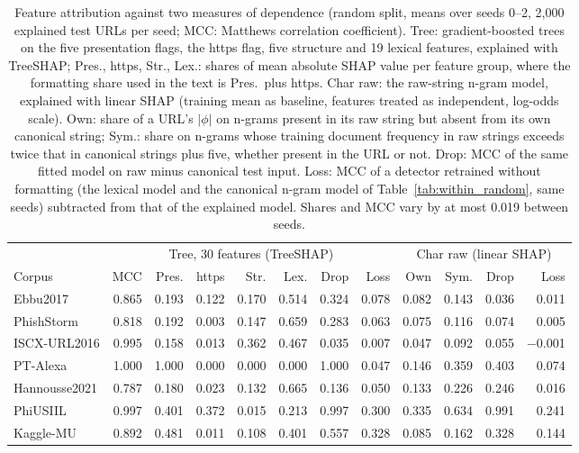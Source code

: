 \begin{table}[tp]
\centering
\caption{Feature attribution against two measures of dependence (random split, means over seeds 0--2, 2,000 explained test URLs per seed; MCC: Matthews correlation coefficient). Tree: gradient-boosted trees on the five presentation flags, the https flag, five structure and 19 lexical features, explained with TreeSHAP; Pres., https, Str., Lex.: shares of mean absolute SHAP value per feature group, where the formatting share used in the text is Pres.\ plus https. Char raw: the raw-string n-gram model, explained with linear SHAP (training mean as baseline, features treated as independent, log-odds scale). Own: share of a URL's $|\phi|$ on n-grams present in its raw string but absent from its own canonical string; Sym.: share on n-grams whose training document frequency in raw strings exceeds twice that in canonical strings plus five, whether present in the URL or not. Drop: MCC of the same fitted model on raw minus canonical test input. Loss: MCC of a detector retrained without formatting (the lexical model and the canonical n-gram model of Table~\ref{tab:within_random}, same seeds) subtracted from that of the explained model. Shares and MCC vary by at most 0.019 between seeds.}
\label{tab:shap}
\footnotesize
\setlength{\tabcolsep}{2.5pt}
\begin{adjustbox}{max width=\linewidth}
\begin{tabular}{@{}lrrrrrrrrrrr@{}}
\toprule
 & \multicolumn{7}{c}{Tree, 30 features (TreeSHAP)} & \multicolumn{4}{c}{Char raw (linear SHAP)} \\
\cmidrule(lr){2-8}\cmidrule(lr){9-12}
Corpus & MCC & Pres. & https & Str. & Lex. & Drop & Loss & Own & Sym. & Drop & Loss \\
\midrule
Ebbu2017 & 0.865 & 0.193 & 0.122 & 0.170 & 0.514 & 0.324 & 0.078 & 0.082 & 0.143 & 0.036 & 0.011 \\
PhishStorm & 0.818 & 0.192 & 0.003 & 0.147 & 0.659 & 0.283 & 0.063 & 0.075 & 0.116 & 0.074 & 0.005 \\
ISCX-URL2016 & 0.995 & 0.158 & 0.013 & 0.362 & 0.467 & 0.035 & 0.007 & 0.047 & 0.092 & 0.055 & $-$0.001 \\
PT-Alexa & 1.000 & 1.000 & 0.000 & 0.000 & 0.000 & 1.000 & 0.047 & 0.146 & 0.359 & 0.403 & 0.074 \\
Hannousse2021 & 0.787 & 0.180 & 0.023 & 0.132 & 0.665 & 0.136 & 0.050 & 0.133 & 0.226 & 0.246 & 0.016 \\
PhiUSIIL & 0.997 & 0.401 & 0.372 & 0.015 & 0.213 & 0.997 & 0.300 & 0.335 & 0.634 & 0.991 & 0.241 \\
Kaggle-MU & 0.892 & 0.481 & 0.011 & 0.108 & 0.401 & 0.557 & 0.328 & 0.085 & 0.162 & 0.328 & 0.144 \\
\bottomrule
\end{tabular}
\end{adjustbox}
\end{table}
